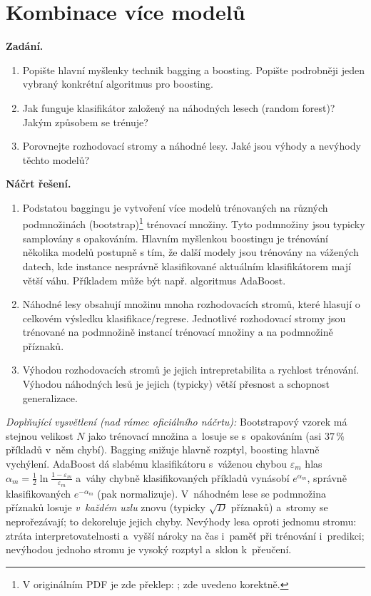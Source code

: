 \section{Kombinace více modelů}

\noindent\textbf{Zadání.}\par
\begin{enumerate}
  \item Popište hlavní myšlenky technik bagging a boosting. Popište podrobněji jeden vybraný konkrétní algoritmus pro
    boosting.
  \item Jak funguje klasifikátor založený na náhodných lesech (random forest)? Jakým způsobem se trénuje?
  \item Porovnejte rozhodovací stromy a náhodné lesy. Jaké jsou výhody a nevýhody těchto modelů?
\end{enumerate}

\medskip
\noindent\textbf{Náčrt řešení.}\par
\begin{enumerate}
  \item Podstatou baggingu je vytvoření více modelů trénovaných na různých podmnožinách (bootstrap)\footnote{V originálním PDF
    je zde překlep: ; zde uvedeno korektně.} trénovací množiny.
    Tyto podmnožiny jsou typicky samplovány s opakováním. Hlavním myšlenkou boostingu je trénování několika modelů
    postupně s tím, že další modely jsou trénovány na vážených datech, kde instance nesprávně klasifikované aktuálním
    klasifikátorem mají větší váhu. Příkladem může být např. algoritmus AdaBoost.
  \item Náhodné lesy obsahují množinu mnoha rozhodovacích stromů, které hlasují o celkovém výsledku klasifikace/regrese.
    Jednotlivé rozhodovací stromy jsou trénované na podmnožině instancí trénovací množiny a na podmnožině příznaků.
  \item Výhodou rozhodovacích stromů je jejich intrepretabilita a rychlost trénování. Výhodou náhodných lesů je jejich
    (typicky) větší přesnost a schopnost generalizace.
\end{enumerate}

\medskip
\noindent\textit{Doplňující vysvětlení (nad rámec oficiálního náčrtu):} Bootstrapový vzorek má stejnou velikost $N$ jako trénovací množina a~losuje se s~opakováním (asi $37\,\%$ příkladů v~něm chybí). Bagging snižuje hlavně rozptyl, boosting hlavně vychýlení. AdaBoost dá slabému klasifikátoru s~váženou chybou $\varepsilon_m$ hlas $\alpha_m=\tfrac12\ln\frac{1-\varepsilon_m}{\varepsilon_m}$ a~váhy chybně klasifikovaných příkladů vynásobí $e^{\alpha_m}$, správně klasifikovaných $e^{-\alpha_m}$ (pak normalizuje). V~náhodném lese se podmnožina příznaků losuje \emph{v~každém uzlu} znovu (typicky $\sqrt{D}$ příznaků) a~stromy se neprořezávají; to dekoreluje jejich chyby. Nevýhody lesa oproti jednomu stromu: ztráta interpretovatelnosti a~vyšší nároky na čas i~paměť při trénování i~predikci; nevýhodou jednoho stromu je vysoký rozptyl a~sklon k~přeučení.
